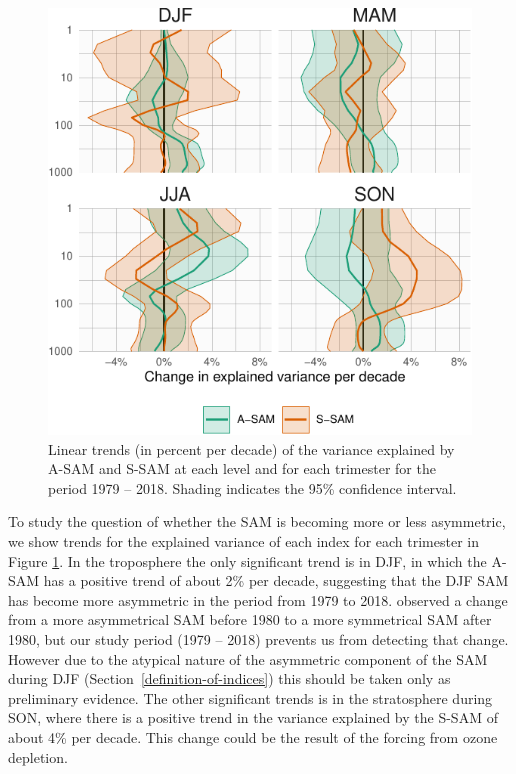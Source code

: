 \documentclass[smallextended]{svjour3}       %
\begin{document}
\begin{figure}
\includegraphics{r-squared-trend-1} \caption{Linear trends (in percent per decade) of the variance explained by A\nobreakdash-SAM and S\nobreakdash-SAM at each level and for each trimester for the period 1979 -- 2018. Shading indicates the 95\% confidence interval.}\label{fig:r-squared-trend}
\end{figure}

To study the question of whether the SAM is becoming more or less asymmetric, we show trends for the explained variance of each index for each trimester in Figure \ref{fig:r-squared-trend}.
In the troposphere the only significant trend is in DJF, in which the A\nobreakdash-SAM has a positive trend of about 2\% per decade, suggesting that the DJF SAM has become more asymmetric in the period from 1979 to 2018.
\citet{fogt2012} observed a change from a more asymmetrical SAM before 1980 to a more symmetrical SAM after 1980, but our study period (1979 -- 2018) prevents us from detecting that change.
However due to the atypical nature of the asymmetric component of the SAM during DJF (Section~\ref{definition-of-indices}) this should be taken only as preliminary evidence.
The other significant trends is in the stratosphere during SON, where there is a positive trend in the variance explained by the S\nobreakdash-SAM of about 4\% per decade.
This change could be the result of the forcing from ozone depletion.
\end{document}
